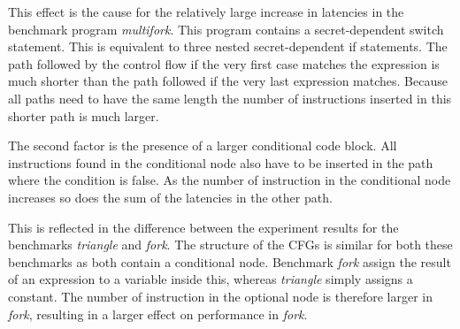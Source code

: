 This effect is the cause for the relatively large increase in latencies in the benchmark  program \textit{multifork}. 
This program contains a secret-dependent switch statement. This is equivalent to three nested secret-dependent if statements. 
The path followed by the control flow if the very first case matches the expression is much shorter than the path followed if the very last expression matches. 
Because all paths need to have the same length the number of instructions inserted in this shorter path is much larger. 

The second factor is the presence of a larger conditional code block. All instructions found in the conditional node also have to be inserted in the path where the condition is false. 
As the number of instruction in the conditional node increases so does the sum of the latencies in the other path.

This is reflected in the difference between the experiment results for the benchmarks \textit{triangle} and \textit{fork}. The structure of the CFGs is similar for both these benchmarks as both contain a conditional node.
Benchmark \textit{fork} assign the result of an expression to a variable inside this, whereas \textit{triangle} simply assigns a constant. The number of instruction in the optional node is therefore larger in \textit{fork}, resulting 
in a larger effect on performance in \textit{fork}.

